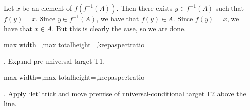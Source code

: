 \documentclass[a4paper,twoside,12pt]{article} %
\makeatletter
\DeclareRobustCommand{\_}{%
  \leavevmode\vbox{%
    \hrule\@width.4em
          \@height-.16ex
          \@depth\dimexpr.16ex+.28pt\relax}}
\newcommand\Tstrut{\rule{0pt}{2.4ex}}
\newcommand\Bstrut{\rule[-1.1ex]{0pt}{0pt}}
\newenvironment{fit}{\begin{adjustbox}{max width=\textwidth,max totalheight=\textheight,keepaspectratio}}{\end{adjustbox}}
\makeatother
\begin{document}
\begin{center}
\begin{minipage}{120mm}
Let $x$ be an element of $f(f^{-1}(A))$. Then there exists $y\in f^{-1}(A)$ such that $f(y) = x$. Since $y\in f^{-1}(A)$, we have that $f(y)\in A$. Since $f(y) = x$, we have that $x\in A$. But this is clearly the case, so we are done.
\end{minipage}
\end{center}

\bigskip
\begin{steps}
\begin{fit}%
\end{fit}
\smallskip

. Expand pre-universal target T1.\nopagebreak[4] 
\marginpar{}\nopagebreak[4] 
\smallskip\nopagebreak[4] 

\begin{fit}%
\end{fit}
\smallskip

. Apply `let' trick and move premise of universal-conditional target T2 above the line.\nopagebreak[4] 
\nopagebreak[4] 
\smallskip\nopagebreak[4] 


\end{steps}
\end{document}
